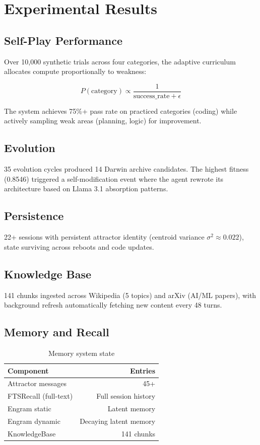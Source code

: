 \documentclass[11pt,a4paper]{article}
\begin{document}
\section{Experimental Results}

\subsection{Self-Play Performance}

Over 10,000 synthetic trials across four categories, the adaptive
curriculum allocates compute proportionally to weakness:

\begin{equation}
P(\text{category}) \propto \frac{1}{\text{success\_rate} + \epsilon}
\end{equation}

The system achieves 75\%+ pass rate on practiced categories (coding) while
actively sampling weak areas (planning, logic) for improvement.

\subsection{Evolution}

35 evolution cycles produced 14 Darwin archive candidates. The highest
fitness (0.8546) triggered a self-modification event where the agent
rewrote its architecture based on Llama 3.1 absorption patterns.

\subsection{Persistence}

22+ sessions with persistent attractor identity (centroid variance
\(\sigma^2 \approx 0.022\)), state surviving across reboots and code
updates.

\subsection{Knowledge Base}

141 chunks ingested across Wikipedia (5 topics) and arXiv (AI/ML papers),
with background refresh automatically fetching new content every 48 turns.

\subsection{Memory and Recall}

\begin{table}[h]
\centering
\caption{Memory system state}
\begin{tabular}{lr}
\toprule
Component & Entries \\
\midrule
Attractor messages & 45+ \\
FTSRecall (full-text) & Full session history \\
Engram static     & Latent memory \\
Engram dynamic    & Decaying latent memory \\
KnowledgeBase     & 141 chunks \\
\bottomrule
\end{tabular}
\end{table}
\end{document}
